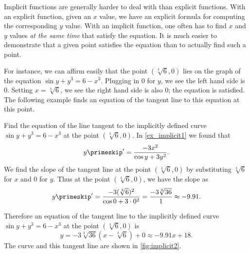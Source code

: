Implicit functions are generally harder to deal with than explicit functions. With an explicit function, given an $x$ value, we have an explicit formula for computing the corresponding $y$ value. With an implicit function, one often has to find $x$ and $y$ values \emph{at the same time} that satisfy the equation. It is much easier to demonstrate that a given point satisfies the equation than to actually find such a point.

For instance, we can affirm easily that the point $(\sqrt[3]{6},0)$ lies on the graph of the equation $\sin y + y^3=6-x^3$. Plugging in $0$ for $y$, we see the left hand side is $0$. Setting $x=\sqrt[3]6$, we see the right hand side is also $0$; the equation is satisfied. The following example finds an equation of the tangent line to this equation at this point.

\begin{example}\label{ex_implicit2}
Find the equation of the line tangent to the implicitly defined curve $\sin y + y^3=6-x^3$ at the point $(\sqrt[3]6,0)$.
\solution
In \autoref{ex_implicit1} we found that
\[y\primeskip' = \frac{-3x^2}{\cos y +3y^2}.\]
We find the slope of the tangent line at the point  $(\sqrt[3]6,0)$ by substituting $\sqrt[3]6$ for $x$ and $0$ for $y$. Thus at the point $(\sqrt[3]6,0)$, we have the slope as
\[y\primeskip' = \frac{-3(\sqrt[3]{6})^2}{\cos 0 + 3\cdot0^2} = \frac{-3\sqrt[3]{36}}{1} \approx -9.91.\]

Therefore an equation of the tangent line to the implicitly defined curve $\sin y + y^3=6-x^3$ at the point $(\sqrt[3]{6},0)$ is
\[y = -3\sqrt[3]{36}(x-\sqrt[3]{6})+0 \approx -9.91x+18.\]
The curve and this tangent line are shown in \autoref{fig:implicit2}.
\end{example}


